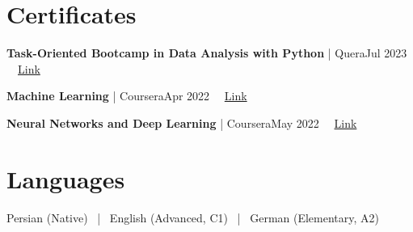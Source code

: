 \documentclass[10pt,a4paper]{article}
\begin{document}
\section{Certificates}
{\bfseries Task-Oriented Bootcamp in Data Analysis with Python} \textcolor{accent}{| Quera}\hfill {\small\color{muted}Jul 2023 \ \textbar\ \href{https://quera.org/certificate/IZqFa07q/}{\textcolor{accent}{Link}}}\par
{\bfseries Machine Learning} \textcolor{accent}{| Coursera}\hfill {\small\color{muted}Apr 2022 \ \textbar\ \href{https://www.coursera.org/account/accomplishments/certificate/VVKTE3ZMT7DL}{\textcolor{accent}{Link}}}\par
{\bfseries Neural Networks and Deep Learning} \textcolor{accent}{| Coursera}\hfill {\small\color{muted}May 2022 \ \textbar\ \href{https://www.coursera.org/account/accomplishments/certificate/EGECLMGFDD9P}{\textcolor{accent}{Link}}}\par


\section{Languages}
Persian (Native) \ | \ English (Advanced, C1) \ | \ German (Elementary, A2)
\end{document}
